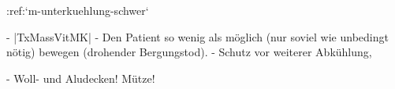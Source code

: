 :ref:`m-unterkuehlung-schwer`
\begin{itemize}
  -   |TxMassVitMK|
  -   Den Patient so wenig als möglich (nur soviel wie unbedingt nötig)
  bewegen (drohender Bergungstod).
  -   Schutz vor weiterer Abkühlung, 
  \begin{itemize}
    -   Woll- und Aludecken! Mütze!
  \end{itemize}
\end{itemize}